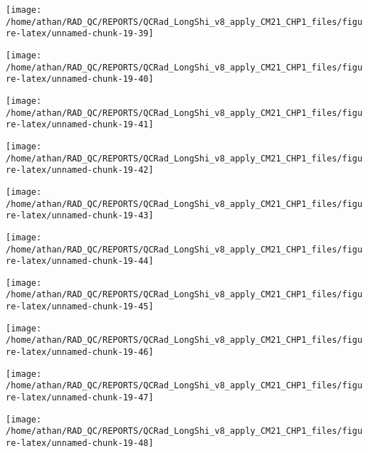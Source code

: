 \documentclass[
  10pt,
  a4paper,oneside]{article}
\begin{document}
\begin{center}\texttt{[image: /home/athan/RAD\_QC/REPORTS/QCRad\_LongShi\_v8\_apply\_CM21\_CHP1\_files/figure-latex/unnamed-chunk-19-39]} \end{center}

\begin{center}\texttt{[image: /home/athan/RAD\_QC/REPORTS/QCRad\_LongShi\_v8\_apply\_CM21\_CHP1\_files/figure-latex/unnamed-chunk-19-40]} \end{center}

\begin{center}\texttt{[image: /home/athan/RAD\_QC/REPORTS/QCRad\_LongShi\_v8\_apply\_CM21\_CHP1\_files/figure-latex/unnamed-chunk-19-41]} \end{center}

\begin{center}\texttt{[image: /home/athan/RAD\_QC/REPORTS/QCRad\_LongShi\_v8\_apply\_CM21\_CHP1\_files/figure-latex/unnamed-chunk-19-42]} \end{center}

\begin{center}\texttt{[image: /home/athan/RAD\_QC/REPORTS/QCRad\_LongShi\_v8\_apply\_CM21\_CHP1\_files/figure-latex/unnamed-chunk-19-43]} \end{center}

\begin{center}\texttt{[image: /home/athan/RAD\_QC/REPORTS/QCRad\_LongShi\_v8\_apply\_CM21\_CHP1\_files/figure-latex/unnamed-chunk-19-44]} \end{center}

\begin{center}\texttt{[image: /home/athan/RAD\_QC/REPORTS/QCRad\_LongShi\_v8\_apply\_CM21\_CHP1\_files/figure-latex/unnamed-chunk-19-45]} \end{center}

\begin{center}\texttt{[image: /home/athan/RAD\_QC/REPORTS/QCRad\_LongShi\_v8\_apply\_CM21\_CHP1\_files/figure-latex/unnamed-chunk-19-46]} \end{center}

\begin{center}\texttt{[image: /home/athan/RAD\_QC/REPORTS/QCRad\_LongShi\_v8\_apply\_CM21\_CHP1\_files/figure-latex/unnamed-chunk-19-47]} \end{center}

\begin{center}\texttt{[image: /home/athan/RAD\_QC/REPORTS/QCRad\_LongShi\_v8\_apply\_CM21\_CHP1\_files/figure-latex/unnamed-chunk-19-48]} \end{center}
\end{document}

